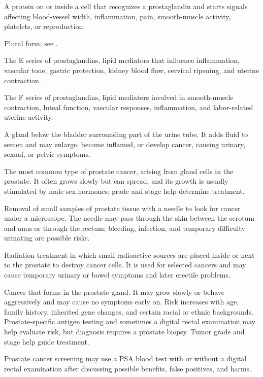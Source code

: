  A protein on or inside a cell that recognizes a prostaglandin and starts signals affecting blood-vessel width, inflammation, pain, smooth-muscle activity, platelets, or reproduction.

 Plural form; see .

 The E series of prostaglandins, lipid mediators that influence inflammation, vascular tone, gastric protection, kidney blood flow, cervical ripening, and uterine contraction.

 The F series of prostaglandins, lipid mediators involved in smooth-muscle contraction, luteal function, vascular responses, inflammation, and labor-related uterine activity.

 A gland below the bladder surrounding part of the urine tube. It adds fluid to semen and may enlarge, become inflamed, or develop cancer, causing urinary, sexual, or pelvic symptoms.

 The most common type of prostate cancer, arising from gland cells in the prostate. It often grows slowly but can spread, and its growth is usually stimulated by male sex hormones; grade and stage help determine treatment.

 Removal of small samples of prostate tissue with a needle to look for cancer under a microscope. The needle may pass through the skin between the scrotum and anus or through the rectum; bleeding, infection, and temporary difficulty urinating are possible risks.

 Radiation treatment in which small radioactive sources are placed inside or next to the prostate to destroy cancer cells. It is used for selected cancers and may cause temporary urinary or bowel symptoms and later erectile problems.

 Cancer that forms in the prostate gland. It may grow slowly or behave aggressively and may cause no symptoms early on. Risk increases with age, family history, inherited gene changes, and certain racial or ethnic backgrounds. Prostate-specific antigen testing and sometimes a digital rectal examination may help evaluate risk, but diagnosis requires a prostate biopsy. Tumor grade and stage help guide treatment.

 Prostate cancer screening may use a PSA blood test with or without a digital rectal examination after discussing possible benefits, false positives, and harms.

